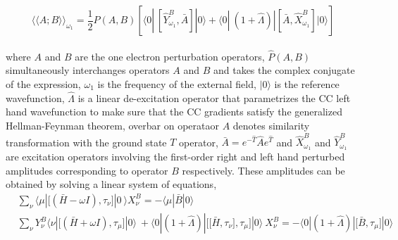 %
\begin{equation}
{\langle\langle A;B\rangle\rangle}_{\omega_1} =  \frac{1}{2}\hat{P}(A,B)[\langle 0 | \
[\hat{Y}^{B}_{\omega_1}, \bar{A}]|0\rangle + \langle 0 | \
(1 + \hat{\Lambda})|[\bar{A},\hat{X}^{B}_{\omega_1}]|0\rangle]
\end{equation}
\\
where $A$ and $B$ are the one electron perturbation operators,
$\hat{P}(A,B)$ simultaneously interchanges operators $A$ and $B$
and takes the complex conjugate of the expression,
$\omega_1$ is the frequency of the external field, 
$|0\rangle$ is the reference wavefunction, $\hat{\Lambda}$ is 
a linear de-excitation operator that parametrizes the CC left hand 
wavefunction to make sure that the CC gradients satisfy the 
generalized Hellman-Feynman theorem\cite{Koch90},
overbar on operataor $A$ denotes similarity transformation with the ground state
$T$ operator, $\bar{A} = e^{-\hat{T}}\hat{A}e^{\hat{T}}$
and $\hat{X}^{B}_{\omega_1}$ and $\hat{Y}^{B}_{\omega_1}$ are excitation operators involving 
the first-order right and left hand perturbed amplitudes corresponding to operator 
$B$ respectively. These amplitudes can be obtained by solving a linear system
of equations,
\begin{equation}
\begin{split}
&\sum_\nu\langle \mu | \big[(\bar{H} - \omega I),\tau_\nu\big] |0 \
\rangle X_{\nu}^{B} = -\langle \mu|\bar{B}|0 \rangle \\
&\sum_\nu Y_{\nu}^{B}\langle \nu | \big[(\bar{H} + \omega I),\tau_\mu\big] |0 \rangle \
+ \langle 0|(1 + \hat{\Lambda})|\big[\big[\bar{H},\tau_\nu\big],\tau_\mu\big] |0 \rangle\  X_{\nu}^{B}
= -\langle 0|(1 + \hat{\Lambda})|\big[\bar{B},\tau_\mu\big] |0 \rangle \\
\end{split}
\end{equation}
